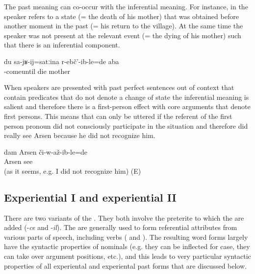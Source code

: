 The past  meaning can co-occur with the inferential meaning. For instance, in  the speaker refers to a state (= the death of his mother) that was obtained before another moment in the past (= his return to the village). At the same time the speaker was not present at the relevant event (= the dying of his mother) such that there is an inferential component.
%
\begin{exe}
	\ex	\label{ex:Before/until I came (home) my mother had already died}
	\gll	du	sa-jʁ-ij=satːina 	r-ebč'-ib-le=de	aba\\
			-comeuntil	die	mother\\
	\glt	{}
\end{exe}

When speakers are presented with past perfect sentences out of context that contain predicates that do not denote a change of state the inferential meaning is salient and therefore there is a first-person effect with core arguments that denote first persons. This means that  can only be uttered if the referent of the first person pronoun did not consciously participate in the situation and therefore did really see Arsen because he did not recognize him.
%
\begin{exe}
	\ex	\label{ex:I saw Arsen. (as it seems, and e.g. I did not recognize him)}
	\gll	dam	Arsen	či-w-až-ib-le=de\\
			Arsen	see\\
	\glt	{} (as it seems, e.g. I did not recognize him) (E)
\end{exe}



\subsection{Experiential I and experiential II}
\label{ssec:Experiential I and experiential II}

There are two variants of the . They both involve the preterite to which the  are added (-\textit{ce} and -\textit{il}). The  are generally used to form referential attributes from various parts of speech, including verbs ( and ). The resulting word forms largely have the syntactic properties of nominals (e.g. they can be inflected for case, they can take over argument positions, etc.), and this leads to very particular syntactic properties of all experiental and experiental past forms that are discussed below.

